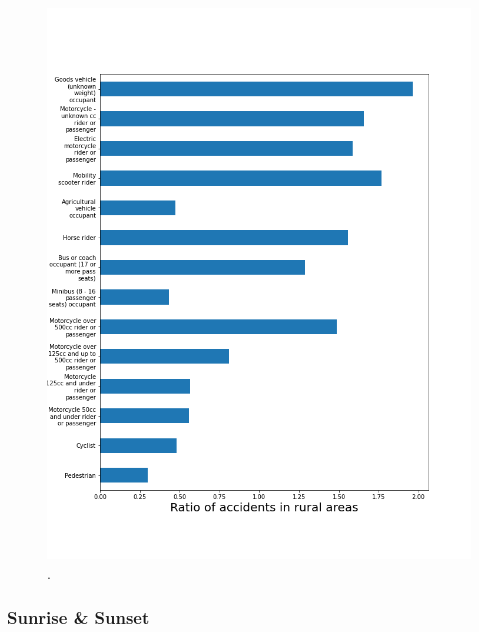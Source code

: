 \documentclass[12pt]{article}
\begin{document}
\begin{figure}[h]
\centering     %
\includegraphics[width=.6\paperwidth]{casualty_rural}
\caption{.}
\end{figure}

\newpage

\subsubsection{Sunrise \& Sunset}
\end{document}
